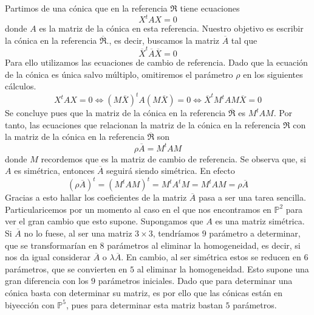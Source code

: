 Partimos de una cónica que en la referencia $\mathfrak{R}$ tiene ecuaciones
\begin{equation}
X^tAX=0
\end{equation}
donde $A$ es la matriz de la cónica en esta referencia. Nuestro objetivo es escribir la cónica en la referencia $\overline{\mathfrak{R}}$., es decir, buscamos la matriz $\overline{A}$ tal que
\begin{equation}
\overline{X}^t\overline{A}\overline{X}=0
\end{equation}
Para ello utilizamos las ecuaciones de cambio de referencia. Dado que la ecuación de la cónica es única salvo múltiplo, omitiremos el parámetro $\rho$ en los siguientes cálculos.
\begin{equation}
X^tAX=0\Leftrightarrow (M\overline{X})^tA(M\overline{X})=0\Leftrightarrow \overline{X}^t M^tAM\overline{X}=0
\end{equation}
Se concluye pues que la matriz de la cónica en la referencia $\overline{\mathfrak{R}}$ es $M^tAM$. Por tanto, las ecuaciones que relacionan la matriz de la cónica en la referencia ${\mathfrak{R}}$ con la matriz de la cónica en la referencia $\overline{\mathfrak{R}}$ son
\begin{equation}
\rho\overline{A}=M^tAM
\end{equation}
donde $M$ recordemos que es la matriz de cambio de referencia. Se observa que, si $A$ es simétrica, entonces $\overline{A}$ seguirá siendo simétrica. En efecto
\begin{equation}
(\rho\overline{A})^t=(M^tAM)^t=M^tA^tM=M^tAM=\rho\overline{A}
\end{equation}
Gracias a esto hallar los coeficientes de la matriz $\overline{A}$ pasa a ser una tarea sencilla. Particularicemos por un momento al caso en el que nos encontramos en $\mathbb{P}^2$ para ver el gran cambio que esto supone. Supongamos que $A$ es una matriz simétrica. Si $\overline{A}$ no lo fuese, al ser una matriz $3\times 3$, tendríamos $9$ parámetro a determinar, que se transformarían en $8$ parámetros al eliminar la homogeneidad, es decir, si nos da igual considerar $\overline{A}$ o $\lambda\overline{A}$. En cambio, al ser simétrica estos se reducen en $6$ parámetros, que se convierten en $5$ al eliminar la homogeneidad. Esto supone una gran diferencia con los $9$ parámetros iniciales. Dado que para determinar una cónica basta con determinar su matriz, es por ello que las cónicas están en biyección con $\mathbb{P}^5$, pues para determinar esta matriz bastan $5$ parámetros.


